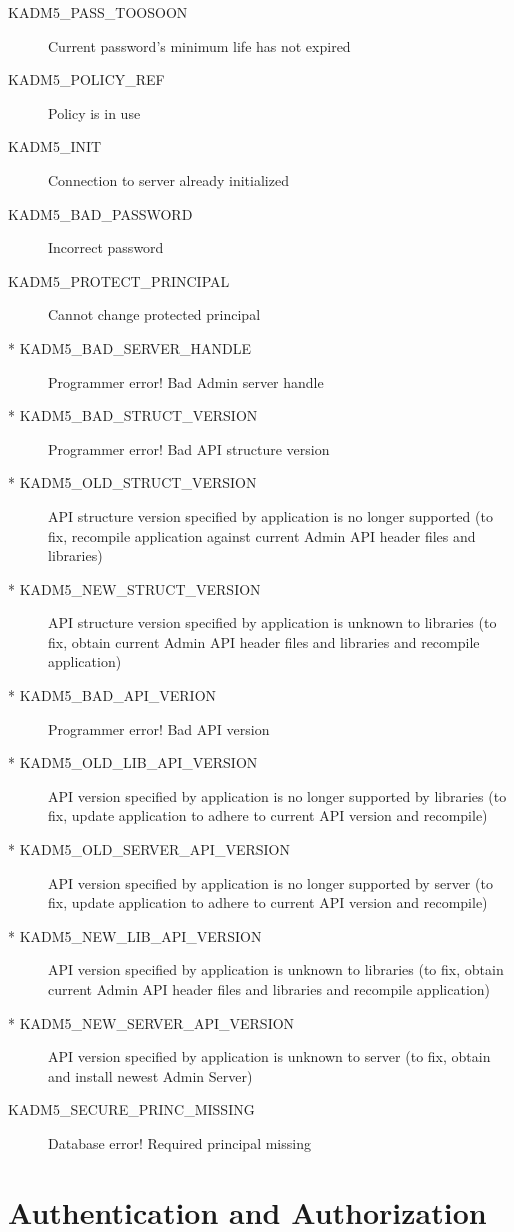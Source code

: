 \begin{description}
\item[KADM5_PASS_TOOSOON] Current password's minimum life has not
expired
\item[KADM5_POLICY_REF] Policy is in use
\item[KADM5_INIT] Connection to server already initialized
\item[KADM5_BAD_PASSWORD] Incorrect password
\item[KADM5_PROTECT_PRINCIPAL] Cannot change protected principal
\item[* KADM5_BAD_SERVER_HANDLE] Programmer error!  Bad Admin server handle
\item[* KADM5_BAD_STRUCT_VERSION] Programmer error!  Bad API structure version
\item[* KADM5_OLD_STRUCT_VERSION] API structure version specified by application is no longer supported (to fix, recompile application against current Admin API header files and libraries)
\item[* KADM5_NEW_STRUCT_VERSION] API structure version specified by application is unknown to libraries (to fix, obtain current Admin API header files and libraries and recompile application)
\item[* KADM5_BAD_API_VERION] Programmer error!  Bad API version
\item[* KADM5_OLD_LIB_API_VERSION] API version specified by application is no longer supported by libraries (to fix, update application to adhere to current API version and recompile)
\item[* KADM5_OLD_SERVER_API_VERSION] API version specified by application is no longer supported by server (to fix, update application to adhere to current API version and recompile)
\item[* KADM5_NEW_LIB_API_VERSION] API version specified by application is unknown to libraries (to fix, obtain current Admin API header files and libraries and recompile application)
\item[* KADM5_NEW_SERVER_API_VERSION] API version specified by
application is unknown to server (to fix, obtain and install newest
Admin Server)
\item[KADM5_SECURE_PRINC_MISSING] Database error! Required principal missing
\end{description}

\section{Authentication and Authorization}
\label{sec:auth}

